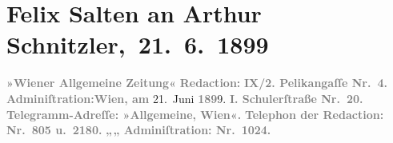 

         
         \renewcommand{\erwaehntePersonen}{Personen: Paul Goldmann, Georg Hirschfeld, Hugo von Hofmannsthal, Gustav Schwarzkopf, Julius Szeps}
         \renewcommand{\erwaehnteInstitutionen}{Institutionen: Burgtheater, Wiener Allgemeine Zeitung}
         \renewcommand{\erwaehnteOrte}{Orte: Berlin, Budapest, Pelikangasse, Schulerstraße, Slawonien, Wien}
         \renewcommand{\erwaehnteWerke}{Werke: ?? [Feuilleton über Paul Goldmann], Reigen. Zehn Dialoge, Scene aus der »Hochzeit der Sobeide«. (Ältere Niederschrift. Wien 1897. — Ungedruckt.), Wiener Allgemeine Montags-Zeitung, Wiener Allgemeine Rundschau}
               \section[ Felix Salten an Arthur Schnitzler, 21. 6. 1899]{ Felix Salten an Arthur Schnitzler, 21. 6. 1899}\nopagebreak{}\rehead{ }\begin{ledgroupsized}[t]{13cm}\normalsize\beginnumbering \toendnotes[C]{\smallbreak\pagebreak[2]} 
\toendnotes[C]{\smallbreak}\pstart
           \noindent{}{\pb}\textcolor{gray}{\textbf{\textbf{»Wiener Allgemeine
                        Zeitung«}}}\pend
           \pstart
           \textcolor{gray}{\textbf{Redaction:}}\pend
           \pstart
           \textcolor{gray}{\textbf{IX/2. \textbf{Pelikangaſſe
                        Nr.} 4. }}\pend
           \pstart
           \textcolor{gray}{\textbf{Adminiſtration:}}\hfill \textcolor{gray}{\textbf{Wien, am}}{ }21. Juni \textcolor{gray}{\textbf{189}}9.\pend
           \pstart
           \textcolor{gray}{\textbf{I. \textbf{Schulerſtraße
                        Nr.} 20. }}\pend
           \pstart
           \textcolor{gray}{\textbf{Telegramm-Adreſſe: »Allgemeine, Wien«.}}\pend
           \pstart
           \textcolor{gray}{\textbf{Telephon der Redaction: Nr. 805 u. 2180.}}\pend
           \pstart
           \textcolor{gray}{\textbf{\hspace*{1.5em}„\hspace*{1.5em}„\hspace*{1.5em} Adminiſtration: Nr. 1024.}}\pend

\end{ledgroupsized}

